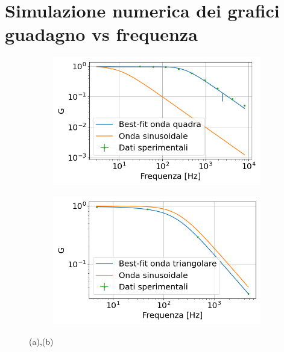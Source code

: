 \documentclass{article}
\begin{document}
\section{Simulazione numerica dei grafici guadagno vs frequenza}
        \begin{figure}[htbp]
            \centering
            \begin{subfigure}{0.45\textwidth} %
                \centering
                \includegraphics[width=\textwidth]{gain_squarewave.png} %
                \caption{}
                \label{fig:image1}
            \end{subfigure}
            \hfill %
            \begin{subfigure}{0.45\textwidth} %
                \centering
                \includegraphics[width=\textwidth]{gain_trianwave.png} %
                \caption{}
                \label{fig:image2}
            \end{subfigure}
            \caption{(a),(b)}
            \label{fig:side_by_side_images}
        \end{figure}
\end{document}
